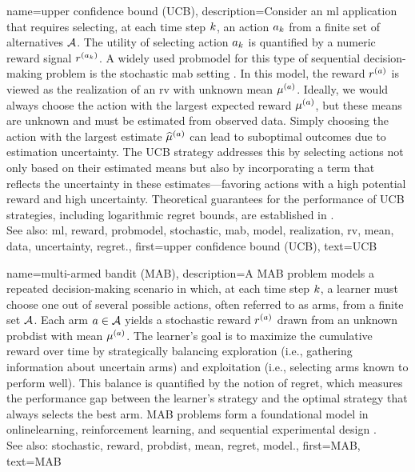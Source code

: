 {name={upper confidence bound (UCB)},
	description={Consider an \gls{ml} 
		application that requires selecting, at each time step $k$, an action $a_{k}$ 
		from a finite set of alternatives $\mathcal{A}$. The utility of selecting action $a_{k}$ 
		is quantified by a numeric \gls{reward} signal $r^{(a_{k})}$. 
		A widely used \gls{probmodel} for this type of sequential decision-making problem 
		is the \gls{stochastic} \gls{mab} setting \cite{Bubeck2012}. In this \gls{model}, 
		the \gls{reward} $r^{(a)}$ is viewed as the \gls{realization} of an \gls{rv} 
		with unknown \gls{mean} $\mu^{(a)}$. Ideally, we would always choose the 
		action with the largest expected \gls{reward} $\mu^{(a)}$, but these 
		\glspl{mean} are unknown and must be estimated from observed \gls{data}. Simply 
		choosing the action with the largest estimate $\widehat{\mu}^{(a)}$ can 
		lead to suboptimal outcomes due to estimation \gls{uncertainty}. The UCB strategy 
		addresses this by selecting actions not only based on their estimated \glspl{mean} but 
		also by incorporating a term that reflects the \gls{uncertainty} in these estimates—favoring 
		actions with a high potential \gls{reward} and high \gls{uncertainty}. Theoretical guarantees 
		for the performance of UCB strategies, including logarithmic \gls{regret} bounds, are established in \cite{Bubeck2012}.
					\\ 
		See also: \gls{ml}, \gls{reward}, \gls{probmodel}, \gls{stochastic}, \gls{mab}, \gls{model}, \gls{realization}, \gls{rv}, \gls{mean}, \gls{data}, \gls{uncertainty}, \gls{regret}.},
	first={upper confidence bound (UCB)},
	text={UCB} 
}

{name={multi-armed bandit (MAB)},
	description={A MAB problem models 
		a repeated decision-making scenario in which, at each time step $k$, a learner must 
		choose one out of several possible actions, often referred to as arms, from a finite 
		set $\mathcal{A}$. Each arm $a \in \mathcal{A}$ yields a \gls{stochastic} \gls{reward} $r^{(a)}$ 
		drawn from an unknown \gls{probdist} with \gls{mean} $\mu^{(a)}$. 
		The learner’s goal is to maximize the cumulative \gls{reward} over time by 
		strategically balancing exploration (i.e., gathering information about 
		uncertain arms) and exploitation (i.e., selecting arms known to perform well). 
		This balance is quantified by the notion of \gls{regret}, which measures the performance 
		gap between the learner's strategy and the optimal strategy that always selects the best arm. 
		MAB problems form a foundational \gls{model} in \gls{onlinelearning}, reinforcement learning, 
		and sequential experimental design \cite{Bubeck2012}.
					\\ 
		See also: \gls{stochastic}, \gls{reward}, \gls{probdist}, \gls{mean}, \gls{regret}, \gls{model}.},
	first={MAB},
	text={MAB}
}



